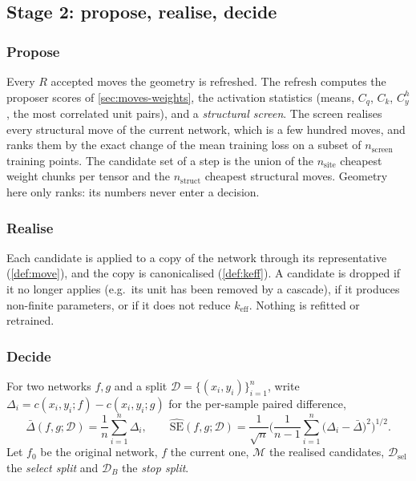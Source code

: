 \documentclass[11pt,a4paper]{article}
\theoremstyle{definition}
\newcommand{\D}{\mathcal{D}}
\newcommand{\keff}{k_{\mathrm{eff}}}
\newcommand{\Dsel}{\D_{\mathrm{sel}}}
\newcommand{\DB}{\D_{B}}
\newcommand{\Mv}{\mathcal{M}}
\newcommand{\dbar}{\bar{\Delta}}
\newcommand{\sehat}{\widehat{\mathrm{SE}}}
\begin{document}
\subsection{Stage 2: propose, realise, decide}
\label{sec:stage2}

\subsubsection{Propose}
\label{sec:propose}

Every $R$ accepted moves the geometry is refreshed. The refresh computes the proposer
scores of \cref{sec:moves-weights}, the activation statistics (means, $C_q$, $C_k$,
$C^h_y$, the most correlated unit pairs), and a \emph{structural screen}. The screen
realises every structural move of the current network, which is a few hundred moves,
and ranks them by the exact change of the mean training loss on a subset of
$n_{\mathrm{screen}}$ training points. The candidate set of a step is the union of the
$n_{\mathrm{site}}$ cheapest weight chunks per tensor and the $n_{\mathrm{struct}}$
cheapest structural moves. Geometry here only ranks: its numbers never enter a decision.

\subsubsection{Realise}
\label{sec:realise}

Each candidate is applied to a copy of the network through its representative
(\cref{def:move}), and the copy is canonicalised (\cref{def:keff}). A candidate is
dropped if it no longer applies (e.g.\ its unit has been removed by a cascade), if it
produces non-finite parameters, or if it does not reduce $\keff$. Nothing is refitted
or retrained.

\subsubsection{Decide}
\label{sec:decide}

For two networks $f,g$ and a split $\D=\{(x_i,y_i)\}_{i=1}^{n}$, write
$\Delta_i=c(x_i,y_i;f)-c(x_i,y_i;g)$ for the per-sample paired difference,
\[
\dbar(f,g;\D)=\frac1n\sum_{i=1}^{n}\Delta_i,\qquad
\sehat(f,g;\D)=\frac{1}{\sqrt n}\Big(\frac{1}{n-1}\sum_{i=1}^{n}\big(\Delta_i-\dbar\big)^2\Big)^{1/2}.
\]
Let $f_0$ be the original network, $f$ the current one, $\Mv$ the realised candidates,
$\Dsel$ the \emph{select split} and $\DB$ the \emph{stop split}.
\end{document}
